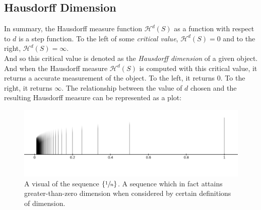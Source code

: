 \documentclass[11pt]{ekblite}
\begin{document}
\begin{example}
	\subsection{Hausdorff Dimension}
	In summary, the Hausdorff measure function $\mathcal{H}^d (S)$ as a function with respect to $d$ is a step function. To the left of some \textit{critical value}, $\mathcal{H}^d (S) = 0$ and to the right, $\mathcal{H}^d (S) = \infty$.
	\\[0.2in]And so this critical value is denoted as the \textit{Hausdorff dimension} of a given object. And when the Hausdorff measure $\mathcal{H}^d (S)$ is computed with this critical value, it returns a accurate measurement of the object. To the left, it returns 0. To the right, it returns $\infty$.
	The relationship between the value of $d$ chosen and the resulting Hausdorff measure can be represented as a plot:
\end{example}


\begin{figure}[h]
	\includegraphics[scale=0.25]{img/c21.jpg}
	\caption{A visual of the sequence $\{\sfrac{1}{n}\}$. A sequence which in fact attains greater-than-zero dimension when considered by certain definitions of dimension.}
\end{figure}
\newpage
\end{document}
